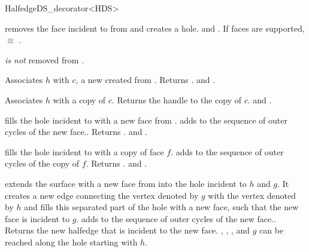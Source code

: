 \begin{ccRefClass}{HalfedgeDS_decorator<HDS>}


   {removes the face incident to  from  and creates a hole.
    \ccPrecond {} and . 
     If faces are supported,  
     $\equiv$ .
    
    {\XHDS {}  {\em is not} removed from }.
   }

   {\XHDS Associates $h$ with $c$, a new  created from .
    Returns .
    \ccPrecond {} and .}

   {\XHDS Associates $h$ with a copy of $c$.
  Returns the handle to the copy of $c$.
    \ccPrecond {} and .}

   {fills the hole incident to  with a new face from .
   {\XHDS adds  to the sequence of outer cycles of the new face.}.
    Returns .
    \ccPrecond {} and .}

   {fills the hole incident to  with a copy of face $f$.
   {\XHDS adds  to the sequence of outer cycles of the copy of $f$}.
    Returns .
    \ccPrecond {} and .}

   {extends the surface with a new face from  into the hole 
    incident to $h$ and $g$. It creates a new edge connecting the vertex
    denoted by $g$ with the vertex denoted by $h$ and fills this separated 
    part of the hole with a new face, such that the new face is incident 
    to $g$. 
    {\XHDS adds  to the sequence of outer cycles of the new face.}.
    Returns the new halfedge that is incident to the new face.
    \ccPrecond {}, ,
    ,  and $g$ can be reached 
    along the hole starting with $h$.}


\end{ccRefClass}
